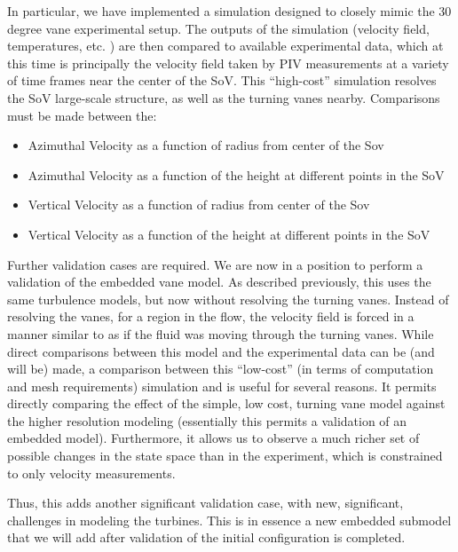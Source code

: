 In particular, we have implemented a simulation designed
to closely mimic the 30 degree vane experimental setup. The outputs of
the simulation (velocity field, temperatures, etc. ) are then compared
to available experimental data, which at this time is principally the
velocity field taken by PIV measurements at a variety of time frames
near the center of the SoV. This ``high-cost'' simulation resolves
the SoV large-scale structure, as well as the turning vanes
nearby. Comparisons must be made between the:
\begin{itemize}
 \item Azimuthal Velocity as a function of radius from center of the Sov
 \item Azimuthal Velocity as a function of the height at different
       points in the SoV
 \item Vertical Velocity as a function of radius from center of the Sov
 \item Vertical Velocity as a function of the height at different
       points in the SoV
\end{itemize}

%
%
Further validation cases are required. We are now in a position to perform
a validation of the embedded vane model. As described previously, this
uses the same turbulence models, but now without resolving the turning
vanes. Instead of resolving the vanes, for a region in the flow, the
velocity field is forced in a manner similar to as if the fluid was
moving through the turning vanes. While direct comparisons between this
model and the experimental data can be (and will be) made, a comparison between this
``low-cost'' (in terms of computation and mesh requirements) simulation
and is useful for several reasons. It permits directly comparing the effect of
the simple, low cost, turning vane model against the higher resolution
modeling (essentially this permits a validation of an embedded
model). Furthermore, it allows us to observe a much richer set of
possible changes in the state space than in the experiment, which is
constrained to only velocity measurements. 


%
%
%


%
%
Thus, this adds another significant validation case, with new, significant,
challenges in modeling the turbines. This is in essence a new embedded
submodel that we will add after validation of the initial configuration
is completed. 
